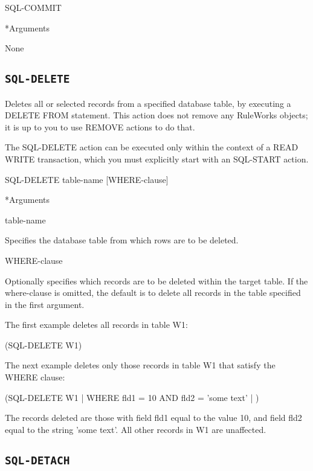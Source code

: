 {{\Format

SQL-COMMIT



*Arguments

None



\subsection{\tt{SQL-DELETE}}

Deletes all or selected records from a specified database
table, by executing a DELETE FROM statement. This action does
not remove any RuleWorks objects; it is up to you to use
REMOVE actions to do that.

The SQL-DELETE action can be executed only within the context
of a READ WRITE transaction, which you must explicitly start
with an SQL-START action.



\Format

SQL-DELETE table-name [WHERE-clause]



*Arguments

table-name

Specifies the database table from which rows are to be
deleted.

WHERE-clause

Optionally specifies which records are to be deleted within
the target table. If the where-clause is omitted, the default
is to delete all records in the table specified in the first
argument.



\Example

The first example deletes all records in table W1:



(SQL-DELETE W1)



The next example deletes only those records in table W1 that
satisfy the WHERE clause:



(SQL-DELETE W1 | WHERE fld1 = 10 AND fld2 = 'some text' | )



The records deleted are those with field fld1 equal to the
value 10, and field fld2 equal to the string 'some text'. All
other records in W1 are unaffected.

\subsection{\tt{SQL-DETACH}}

}}

